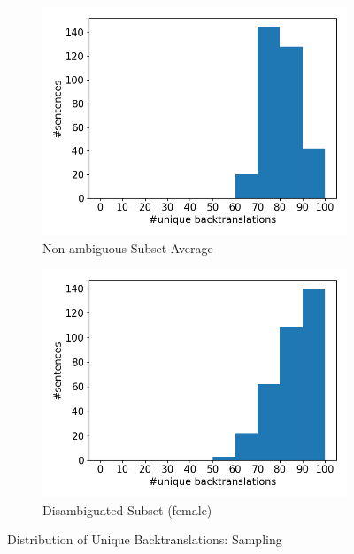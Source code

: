 \begin{figure}[!htb]
\begin{subfigure}{0.49\textwidth}
     \end{subfigure}
     \begin{subfigure}{0.49\textwidth}
         \centering
         \includegraphics[width=\textwidth]{figures/uniqueness/unique_sampling/unique_back_average.png}
         \caption{Non-ambiguous Subset Average}
     \end{subfigure}
     \hfill
     \begin{subfigure}{0.49\textwidth}
         \centering
         \includegraphics[width=\textwidth]{figures/uniqueness/unique_sampling/unique_back_female.png}
         \caption{Disambiguated Subset (female)}
     \end{subfigure}
        \caption{Distribution of Unique Backtranslations: Sampling}
        \label{fig:uniqueness_graphs_sampling}

\end{figure}


